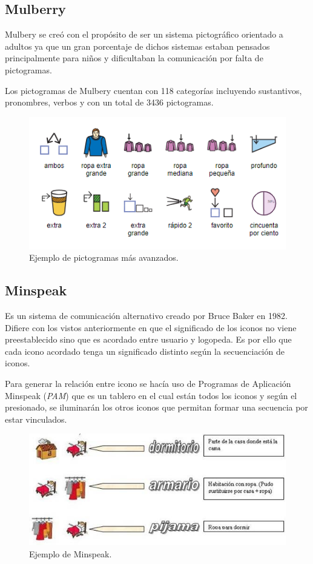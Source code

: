 \newpage
\subsection{Mulberry}
Mulbery se creó con el propósito de ser un sistema pictográfico orientado a adultos ya que un gran porcentaje de dichos sistemas estaban pensados principalmente para niños y dificultaban la comunicación por falta de pictogramas.

Los pictogramas de Mulbery cuentan con 118 categorías incluyendo sustantivos, pronombres, verbos y con un total de 3436 pictogramas.

\begin{figure}[h!]
	\centering
	\includegraphics[scale=0.7]{Imagenes/Bitmap/Mulberry}
	\caption{Ejemplo de pictogramas más avanzados.}
	\label{fig:mulberry}
\end{figure}


\subsection{Minspeak}
Es un sistema de comunicación alternativo creado por Bruce Baker en 1982. Difiere con los vistos anteriormente en que el significado de los iconos no viene preestablecido sino que es acordado entre usuario y logopeda. Es por ello que cada icono acordado tenga un significado distinto según la secuenciación de iconos.

Para generar la relación entre icono se hacía uso de Programas de Aplicación Minspeak (\textit{PAM}) que es un tablero en el cual están todos los iconos y según el presionado, se iluminarán los otros iconos que permitan formar una secuencia por estar vinculados.

\begin{figure}[h!]
	\centering
	\includegraphics[width=0.7\linewidth]{Imagenes/Bitmap/Minspeak}
	\caption{Ejemplo de Minspeak.}
	\label{fig:minspeak}
\end{figure}


